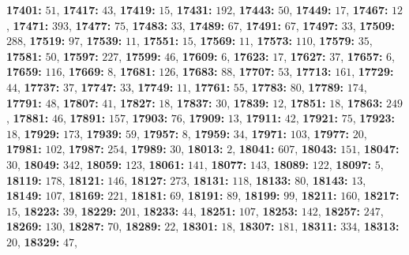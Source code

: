 \textsf{\bfseries 17401:} $51$, \textsf{\bfseries 17417:} $43$, \textsf{\bfseries 17419:} $15$, \textsf{\bfseries 17431:} $192$, \textsf{\bfseries 17443:} $50$, \textsf{\bfseries 17449:} $17$, \textsf{\bfseries 17467:} $12$, \textsf{\bfseries 17471:} $393$, \textsf{\bfseries 17477:} $75$, \textsf{\bfseries 17483:} $33$, \textsf{\bfseries 17489:} $67$, \textsf{\bfseries 17491:} $67$, \textsf{\bfseries 17497:} $33$, \textsf{\bfseries 17509:} $288$, \textsf{\bfseries 17519:} $97$, \textsf{\bfseries 17539:} $11$, \textsf{\bfseries 17551:} $15$, \textsf{\bfseries 17569:} $11$, \textsf{\bfseries 17573:} $110$, \textsf{\bfseries 17579:} $35$, \textsf{\bfseries 17581:} $50$, \textsf{\bfseries 17597:} $227$, \textsf{\bfseries 17599:} $46$, \textsf{\bfseries 17609:} $6$, \textsf{\bfseries 17623:} $17$, \textsf{\bfseries 17627:} $37$, \textsf{\bfseries 17657:} $6$, \textsf{\bfseries 17659:} $116$, \textsf{\bfseries 17669:} $8$, \textsf{\bfseries 17681:} $126$, \textsf{\bfseries 17683:} $88$, \textsf{\bfseries 17707:} $53$, \textsf{\bfseries 17713:} $161$, \textsf{\bfseries 17729:} $44$, \textsf{\bfseries 17737:} $37$, \textsf{\bfseries 17747:} $33$, \textsf{\bfseries 17749:} $11$, \textsf{\bfseries 17761:} $55$, \textsf{\bfseries 17783:} $80$, \textsf{\bfseries 17789:} $174$, \textsf{\bfseries 17791:} $48$, \textsf{\bfseries 17807:} $41$, \textsf{\bfseries 17827:} $18$, \textsf{\bfseries 17837:} $30$, \textsf{\bfseries 17839:} $12$, \textsf{\bfseries 17851:} $18$, \textsf{\bfseries 17863:} $249$, \textsf{\bfseries 17881:} $46$, \textsf{\bfseries 17891:} $157$, \textsf{\bfseries 17903:} $76$, \textsf{\bfseries 17909:} $13$, \textsf{\bfseries 17911:} $42$, \textsf{\bfseries 17921:} $75$, \textsf{\bfseries 17923:} $18$, \textsf{\bfseries 17929:} $173$, \textsf{\bfseries 17939:} $59$, \textsf{\bfseries 17957:} $8$, \textsf{\bfseries 17959:} $34$, \textsf{\bfseries 17971:} $103$, \textsf{\bfseries 17977:} $20$, \textsf{\bfseries 17981:} $102$, \textsf{\bfseries 17987:} $254$, \textsf{\bfseries 17989:} $30$, \textsf{\bfseries 18013:} $2$, \textsf{\bfseries 18041:} $607$, \textsf{\bfseries 18043:} $151$, \textsf{\bfseries 18047:} $30$, \textsf{\bfseries 18049:} $342$, \textsf{\bfseries 18059:} $123$, \textsf{\bfseries 18061:} $141$, \textsf{\bfseries 18077:} $143$, \textsf{\bfseries 18089:} $122$, \textsf{\bfseries 18097:} $5$, \textsf{\bfseries 18119:} $178$, \textsf{\bfseries 18121:} $146$, \textsf{\bfseries 18127:} $273$, \textsf{\bfseries 18131:} $118$, \textsf{\bfseries 18133:} $80$, \textsf{\bfseries 18143:} $13$, \textsf{\bfseries 18149:} $107$, \textsf{\bfseries 18169:} $221$, \textsf{\bfseries 18181:} $69$, \textsf{\bfseries 18191:} $89$, \textsf{\bfseries 18199:} $99$, \textsf{\bfseries 18211:} $160$, \textsf{\bfseries 18217:} $15$, \textsf{\bfseries 18223:} $39$, \textsf{\bfseries 18229:} $201$, \textsf{\bfseries 18233:} $44$, \textsf{\bfseries 18251:} $107$, \textsf{\bfseries 18253:} $142$, \textsf{\bfseries 18257:} $247$, \textsf{\bfseries 18269:} $130$, \textsf{\bfseries 18287:} $70$, \textsf{\bfseries 18289:} $22$, \textsf{\bfseries 18301:} $18$, \textsf{\bfseries 18307:} $181$, \textsf{\bfseries 18311:} $334$, \textsf{\bfseries 18313:} $20$, \textsf{\bfseries 18329:} $47$, 
